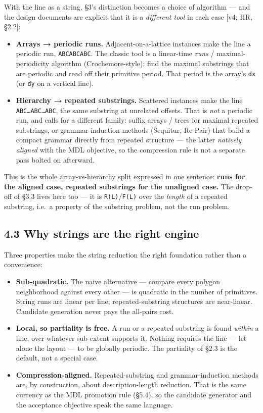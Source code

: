 \documentclass[
  11pt,
]{article}
\providecommand{\tightlist}{%
  \setlength{\itemsep}{0pt}\setlength{\parskip}{0pt}}
\begin{document}
With the line as a string, §3's distinction becomes a choice of
algorithm --- and the design documents are explicit that it is a
\emph{different tool} in each case {[}v4; HR, §2.2{]}:

\begin{itemize}
\tightlist
\item
  \textbf{Arrays → periodic runs.} Adjacent-on-a-lattice instances make
  the line a periodic run, \texttt{ABCABCABC}. The classic tool is a
  linear-time \emph{runs} / maximal-periodicity algorithm
  (Crochemore-style): find the maximal substrings that are periodic and
  read off their primitive period. That period is the array's
  \texttt{dx} (or \texttt{dy} on a vertical line).
\item
  \textbf{Hierarchy → repeated substrings.} Scattered instances make the
  line \texttt{ABC…ABC…ABC}, the same substring at unrelated offsets.
  That is \emph{not} a periodic run, and calls for a different family:
  suffix arrays / trees for maximal repeated substrings, or
  grammar-induction methods (Sequitur, Re-Pair) that build a compact
  grammar directly from repeated structure --- the latter \emph{natively
  aligned} with the MDL objective, so the compression rule is not a
  separate pass bolted on afterward.
\end{itemize}

This is the whole array-vs-hierarchy split expressed in one sentence:
\textbf{runs for the aligned case, repeated substrings for the unaligned
case.} The drop-off of §3.3 lives here too --- it is
\texttt{R(L)}/\texttt{F(L)} over the \emph{length} of a repeated
substring, i.e.~a property of the substring problem, not the run
problem.

\subsection{4.3 Why strings are the right
engine}\label{why-strings-are-the-right-engine}

Three properties make the string reduction the right foundation rather
than a convenience:

\begin{itemize}
\tightlist
\item
  \textbf{Sub-quadratic.} The naive alternative --- compare every
  polygon neighborhood against every other --- is quadratic in the
  number of primitives. String runs are linear per line;
  repeated-substring structures are near-linear. Candidate generation
  never pays the all-pairs cost.
\item
  \textbf{Local, so partiality is free.} A run or a repeated substring
  is found \emph{within} a line, over whatever sub-extent supports it.
  Nothing requires the line --- let alone the layout --- to be globally
  periodic. The partiality of §2.3 is the default, not a special case.
\item
  \textbf{Compression-aligned.} Repeated-substring and grammar-induction
  methods are, by construction, about description-length reduction. That
  is the same currency as the MDL promotion rule (§5.4), so the
  candidate generator and the acceptance objective speak the same
  language.
\end{itemize}
\end{document}
